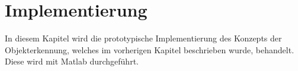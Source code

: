 
\chapter{Implementierung}\label{cha:Implementierung}
In diesem Kapitel wird die prototypische Implementierung des Konzepts der Objekterkennung, welches im vorherigen Kapitel beschrieben wurde, behandelt. Diese wird mit Matlab durchgeführt.
